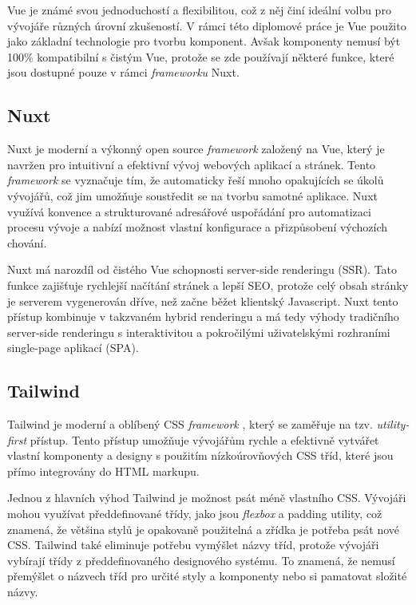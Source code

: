 Vue je známé svou jednoduchostí a flexibilitou, což z něj činí ideální volbu pro vývojáře různých úrovní zkušeností. V rámci této diplomové práce je Vue použito jako základní technologie pro tvorbu komponent. Avšak komponenty nemusí být 100\% kompatibilní s čistým Vue, protože se zde používají některé funkce, které jsou dostupné pouze v rámci \emph{frameworku} Nuxt.

\subsection{Nuxt}
Nuxt je moderní a výkonný open source \emph{framework} založený na Vue, který je navržen pro intuitivní a efektivní vývoj webových aplikací a stránek. Tento \emph{framework} se vyznačuje tím, že automaticky řeší mnoho opakujících se úkolů vývojářů, což jim umožňuje soustředit se na tvorbu samotné aplikace. Nuxt využívá konvence a strukturované adresářové uspořádání pro automatizaci procesu vývoje a nabízí možnost vlastní konfigurace a přizpůsobení výchozích chování.

Nuxt má narozdíl od čistého Vue schopnosti server-side renderingu (SSR). Tato funkce zajišťuje rychlejší načítání stránek a lepší SEO, protože celý obsah stránky je serverem vygenerován dříve, než začne běžet klientský Javascript. Nuxt tento přístup kombinuje v takzvaném hybrid renderingu a má tedy výhody tradičního server-side renderingu s interaktivitou a pokročilými uživatelskými rozhraními single-page aplikací (SPA). \cite{NuxtRenderingModes}

\subsection{Tailwind}
Tailwind je moderní a oblíbený CSS \emph{framework} \cite{StateOfCSS} \cite{StateOfFrontend}, který se zaměřuje na tzv. \emph{utility-first} přístup. Tento přístup umožňuje vývojářům rychle a efektivně vytvářet vlastní komponenty a designy s použitím nízkoúrovňových CSS tříd, které jsou přímo integrovány do HTML markupu.

Jednou z hlavních výhod Tailwind je možnost psát méně vlastního CSS. Vývojáři mohou využívat předdefinované třídy, jako jsou \emph{flexbox} a padding utility, což znamená, že většina stylů je opakovaně použitelná a zřídka je potřeba psát nové CSS. Tailwind také eliminuje potřebu vymýšlet názvy tříd, protože vývojáři vybírají třídy z předdefinovaného designového systému. To znamená, že nemusí přemýšlet o  názvech tříd pro určité styly a komponenty nebo si pamatovat složité názvy. \cite{TailwindUtilityFirst}

